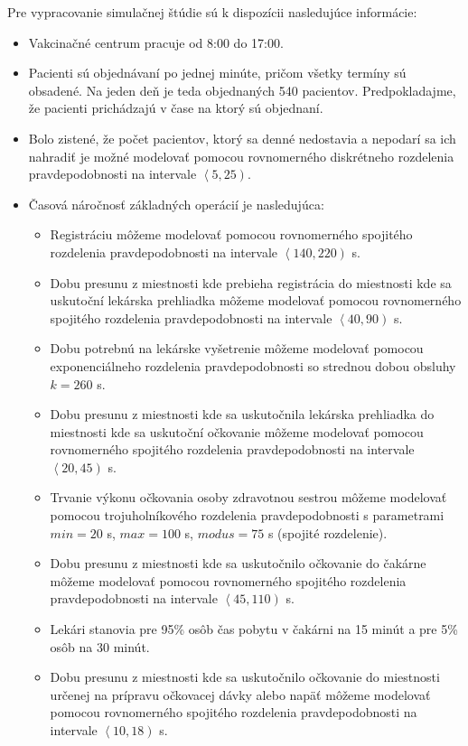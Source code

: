 \documentclass[letterpaper]{article}
\begin{document}
	\noindent Pre vypracovanie simulačnej štúdie sú k dispozícii nasledujúce informácie:
	\begin{itemize}
		\item Vakcinačné centrum pracuje od 8:00 do 17:00.
		\item Pacienti sú objednávaní po jednej minúte, pričom všetky termíny sú obsadené. Na jeden deň je teda objednaných 540 pacientov. Predpokladajme, že pacienti prichádzajú v čase na ktorý sú objednaní.
		\item Bolo zistené, že počet pacientov, ktorý sa denné nedostavia a nepodarí sa ich nahradiť je možné modelovať pomocou rovnomerného diskrétneho rozdelenia pravdepodobnosti na intervale $ \left\langle 5, 25 \right) $. 
		\item Časová náročnosť základných operácií je nasledujúca:
		\begin{itemize}
			\item Registráciu môžeme modelovať pomocou rovnomerného spojitého rozdelenia
			pravdepodobnosti na intervale $ \left\langle 140, 220 \right) $ s.
			\item Dobu presunu z miestnosti kde prebieha registrácia do miestnosti kde sa uskutoční lekárska prehliadka môžeme modelovať pomocou rovnomerného spojitého rozdelenia pravdepodobnosti na intervale $ \left\langle 40, 90 \right) $ s.
			\item Dobu potrebnú na lekárske vyšetrenie môžeme modelovať pomocou exponenciálneho rozdelenia pravdepodobnosti so strednou dobou obsluhy $ k = 260 $ s.
			\item Dobu presunu z miestnosti kde sa uskutočnila lekárska prehliadka do miestnosti kde sa uskutoční očkovanie môžeme modelovať pomocou rovnomerného spojitého rozdelenia pravdepodobnosti na intervale $ \left\langle 20, 45 \right) $ s.
			\item Trvanie výkonu očkovania osoby zdravotnou sestrou môžeme modelovať pomocou trojuholníkového rozdelenia pravdepodobnosti s parametrami $ min = 20 $ s, $ max = 100 $ s, $ modus = 75 $ s (spojité rozdelenie).
			\item Dobu presunu z miestnosti kde sa uskutočnilo očkovanie do čakárne môžeme modelovať
			pomocou rovnomerného spojitého rozdelenia pravdepodobnosti na intervale $ \left\langle 45, 110 \right) $ s.
			\item Lekári stanovia pre 95\% osôb čas pobytu v čakárni na 15 minút a pre 5\% osôb na 30 minút.
			\item Dobu presunu z miestnosti kde sa uskutočnilo očkovanie do miestnosti určenej na prípravu očkovacej dávky alebo napäť môžeme modelovať pomocou rovnomerného spojitého rozdelenia pravdepodobnosti na intervale $ \left\langle 10, 18 \right) $ s. 

\end{itemize}
\end{itemize}
\end{document}
